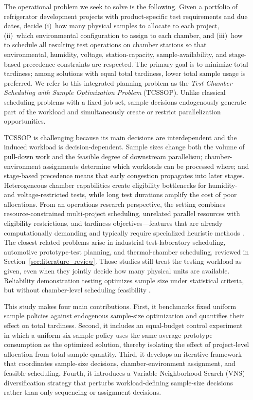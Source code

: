 \documentclass[11pt]{article}
\begin{document}
The operational problem we seek to solve is the following. Given a portfolio of refrigerator development projects with product-specific test requirements and due dates, decide (i)~how many physical samples to allocate to each project, (ii)~which environmental configuration to assign to each chamber, and (iii)~how to schedule all resulting test operations on chamber stations so that environmental, humidity, voltage, station-capacity, sample-availability, and stage-based precedence constraints are respected. The primary goal is to minimize total tardiness; among solutions with equal total tardiness, lower total sample usage is preferred. We refer to this integrated planning problem as the \emph{Test Chamber Scheduling with Sample Optimization Problem} (TCSSOP). Unlike classical scheduling problems with a fixed job set, sample decisions endogenously generate part of the workload and simultaneously create or restrict parallelization opportunities.

TCSSOP is challenging because its main decisions are interdependent and the induced workload is decision-dependent. Sample sizes change both the volume of pull-down work and the feasible degree of downstream parallelism; chamber-environment assignments determine which workloads can be processed where; and stage-based precedence means that early congestion propagates into later stages. Heterogeneous chamber capabilities create eligibility bottlenecks for humidity- and voltage-restricted tests, while long test durations amplify the cost of poor allocations. From an operations research perspective, the setting combines resource-constrained multi-project scheduling, unrelated parallel resources with eligibility restrictions, and tardiness objectives---features that are already computationally demanding and typically require specialized heuristic methods \citep{HartmannBriskorn2022,GomezSanchezLallaRuizFernandezGilCastroVoss2023,UlagaDurasevicJakobovic2022,MaeckerShenMonch2023,AfzaliradRezaeian2016}. The closest related problems arise in industrial test-laboratory scheduling, automotive prototype-test planning, and thermal-chamber scheduling, reviewed in Section~\ref{sec:literature_review}. Those studies still treat the testing workload as given, even when they jointly decide how many physical units are available. Reliability demonstration testing optimizes sample size under statistical criteria, but without chamber-level scheduling feasibility \citep{Fernandez2022}.

This study makes four main contributions. First, it benchmarks fixed uniform sample policies against endogenous sample-size optimization and quantifies their effect on total tardiness. Second, it includes an equal-budget control experiment in which a uniform six-sample policy uses the same average prototype consumption as the optimized solution, thereby isolating the effect of project-level allocation from total sample quantity. Third, it develops an iterative framework that coordinates sample-size decisions, chamber-environment assignment, and feasible scheduling. Fourth, it introduces a Variable Neighborhood Search (VNS) diversification strategy that perturbs workload-defining sample-size decisions rather than only sequencing or assignment decisions.
\end{document}
